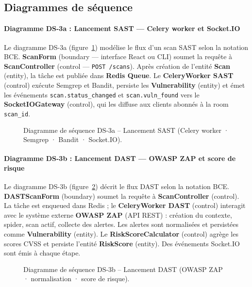 \subsection{Diagrammes de séquence}

\paragraph{Diagramme DS-3a : Lancement SAST — Celery worker et Socket.IO}

Le diagramme DS-3a (figure~\ref{fig:sprint3-seq-sast}) modélise le flux d'un scan SAST selon la notation BCE. \textbf{ScanForm} (boundary — interface React ou CLI) soumet la requête à \textbf{ScanController} (control — \texttt{POST /scans}). Après création de l'entité \textbf{Scan} (entity), la tâche est publiée dans \textbf{Redis Queue}. Le \textbf{CeleryWorker SAST} (control) exécute Semgrep et Bandit, persiste les \textbf{Vulnerability} (entity) et émet les événements \texttt{scan.status\_changed} et \texttt{scan.vuln\_found} vers le \textbf{SocketIOGateway} (control), qui les diffuse aux clients abonnés à la room \texttt{scan\_id}.

\begin{figure}[H]
\centering
\fbox{\rule{0pt}{2in}\rule{0.9\linewidth}{0pt}}
\caption{Diagramme de séquence DS-3a -- Lancement SAST (Celery worker · Semgrep · Bandit · Socket.IO).}
\label{fig:sprint3-seq-sast}
\end{figure}

\paragraph{Diagramme DS-3b : Lancement DAST — OWASP ZAP et score de risque}

Le diagramme DS-3b (figure~\ref{fig:sprint3-seq-dast}) décrit le flux DAST selon la notation BCE. \textbf{DASTScanForm} (boundary) soumet la requête à \textbf{ScanController} (control). La tâche est enqueued dans Redis ; le \textbf{CeleryWorker DAST} (control) interagit avec le système externe \textbf{OWASP ZAP} (API REST) : création du contexte, spider, scan actif, collecte des alertes. Les alertes sont normalisées et persistées comme \textbf{Vulnerability} (entity). Le \textbf{RiskScoreCalculator} (control) agrège les scores CVSS et persiste l'entité \textbf{RiskScore} (entity). Des événements Socket.IO sont émis à chaque étape.

\begin{figure}[H]
\centering
\fbox{\rule{0pt}{2in}\rule{0.9\linewidth}{0pt}}
\caption{Diagramme de séquence DS-3b -- Lancement DAST (OWASP ZAP · normalisation · score de risque).}
\label{fig:sprint3-seq-dast}
\end{figure}

